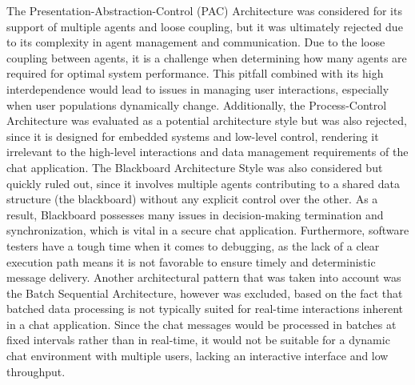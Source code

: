 \documentclass[]{article}
\begin{document}
The Presentation-Abstraction-Control (PAC) Architecture was considered for its support of multiple agents and loose coupling, but it was ultimately rejected due to its complexity in agent management and communication. Due to the loose coupling between agents, it is a challenge when determining how many agents are required for optimal system performance. This pitfall combined with its high interdependence would lead to issues in managing user interactions, especially when user populations dynamically change.
\newline\newline
Additionally, the Process-Control Architecture was evaluated as a potential architecture style but was also rejected, since it is designed for embedded systems and low-level control, rendering it irrelevant to the high-level interactions and data management requirements of the chat application.
\newline\newline
The Blackboard Architecture Style was also considered but quickly ruled out, since it involves multiple agents contributing to a shared data structure (the blackboard) without any explicit control over the other. As a result, Blackboard possesses many issues in decision-making termination and synchronization, which is vital in a secure chat application. Furthermore, software testers have a tough time when it comes to debugging, as the lack of a clear execution path means it is not favorable to ensure timely and deterministic message delivery.
\newline\newline
Another architectural pattern that was taken into account was the Batch Sequential Architecture, however was excluded, based on the fact that batched data processing is not typically suited for real-time interactions inherent in a chat application. Since the chat messages would be processed in batches at fixed intervals rather than in real-time, it would not be suitable for a dynamic chat environment with multiple users, lacking an interactive interface and low throughput.
\newline\newline
\end{document}
